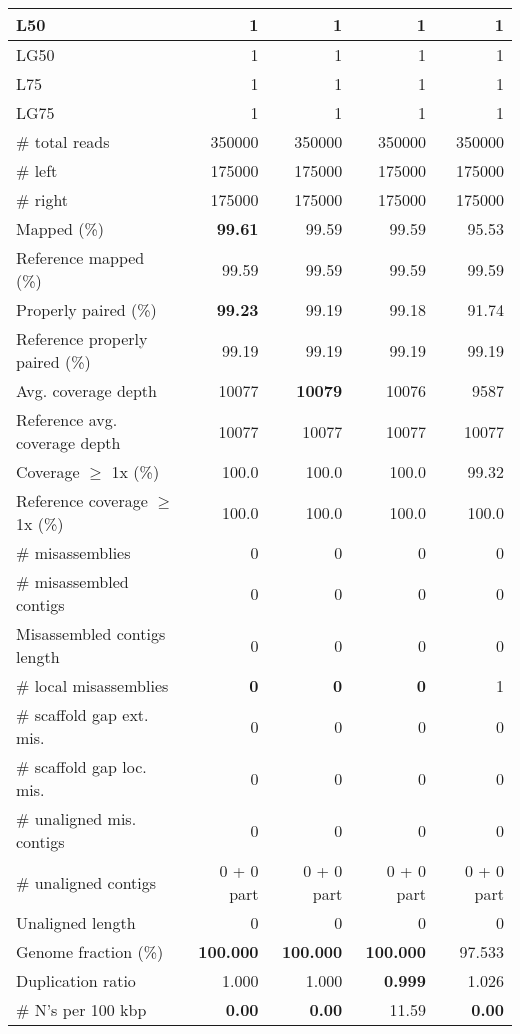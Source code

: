\documentclass[12pt,a4paper]{article}
\begin{document}
\begin{table}[ht]
\begin{center}
\begin{tabular}{|l*{4}{|r}|}
L50 & 1 & 1 & 1 & 1 \\ \hline
LG50 & 1 & 1 & 1 & 1 \\ \hline
L75 & 1 & 1 & 1 & 1 \\ \hline
LG75 & 1 & 1 & 1 & 1 \\ \hline
\# total reads & 350000 & 350000 & 350000 & 350000 \\ \hline
\# left & 175000 & 175000 & 175000 & 175000 \\ \hline
\# right & 175000 & 175000 & 175000 & 175000 \\ \hline
Mapped (\%) & {\bf 99.61} & 99.59 & 99.59 & 95.53 \\ \hline
Reference mapped (\%) & 99.59 & 99.59 & 99.59 & 99.59 \\ \hline
Properly paired (\%) & {\bf 99.23} & 99.19 & 99.18 & 91.74 \\ \hline
Reference properly paired (\%) & 99.19 & 99.19 & 99.19 & 99.19 \\ \hline
Avg. coverage depth & 10077 & {\bf 10079} & 10076 & 9587 \\ \hline
Reference avg. coverage depth & 10077 & 10077 & 10077 & 10077 \\ \hline
Coverage $\geq$ 1x (\%) & 100.0 & 100.0 & 100.0 & 99.32 \\ \hline
Reference coverage $\geq$ 1x (\%) & 100.0 & 100.0 & 100.0 & 100.0 \\ \hline
\# misassemblies & 0 & 0 & 0 & 0 \\ \hline
\# misassembled contigs & 0 & 0 & 0 & 0 \\ \hline
Misassembled contigs length & 0 & 0 & 0 & 0 \\ \hline
\# local misassemblies & {\bf 0} & {\bf 0} & {\bf 0} & 1 \\ \hline
\# scaffold gap ext. mis. & 0 & 0 & 0 & 0 \\ \hline
\# scaffold gap loc. mis. & 0 & 0 & 0 & 0 \\ \hline
\# unaligned mis. contigs & 0 & 0 & 0 & 0 \\ \hline
\# unaligned contigs & 0 + 0 part & 0 + 0 part & 0 + 0 part & 0 + 0 part \\ \hline
Unaligned length & 0 & 0 & 0 & 0 \\ \hline
Genome fraction (\%) & {\bf 100.000} & {\bf 100.000} & {\bf 100.000} & 97.533 \\ \hline
Duplication ratio & 1.000 & 1.000 & {\bf 0.999} & 1.026 \\ \hline
\# N's per 100 kbp & {\bf 0.00} & {\bf 0.00} & 11.59 & {\bf 0.00} \\ \hline

\end{tabular}
\end{center}
\end{table}
\end{document}
